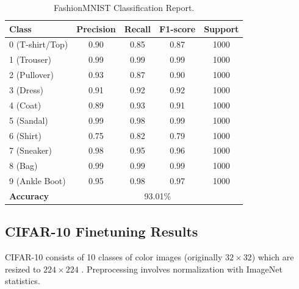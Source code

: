 \documentclass[conference]{IEEEtran}
\begin{document}
\begin{table}[H]
    \centering
    \scriptsize
    \begin{tabular}{lcccc}
        \toprule
        \textbf{Class}    & \textbf{Precision}          & \textbf{Recall} & \textbf{F1-score} & \textbf{Support} \\
        \midrule
        0 (T-shirt/Top)   & 0.90                        & 0.85            & 0.87              & 1000             \\
        1 (Trouser)       & 0.99                        & 0.99            & 0.99              & 1000             \\
        2 (Pullover)      & 0.93                        & 0.87            & 0.90              & 1000             \\
        3 (Dress)         & 0.91                        & 0.92            & 0.92              & 1000             \\
        4 (Coat)          & 0.89                        & 0.93            & 0.91              & 1000             \\
        5 (Sandal)        & 0.99                        & 0.98            & 0.99              & 1000             \\
        6 (Shirt)         & 0.75                        & 0.82            & 0.79              & 1000             \\
        7 (Sneaker)       & 0.98                        & 0.95            & 0.96              & 1000             \\
        8 (Bag)           & 0.99                        & 0.99            & 0.99              & 1000             \\
        9 (Ankle Boot)    & 0.95                        & 0.98            & 0.97              & 1000             \\
        \midrule
        \textbf{Accuracy} & \multicolumn{4}{c}{93.01\%}                                                          \\
        \bottomrule
    \end{tabular}
    \caption{FashionMNIST Classification Report.}
    \label{tab:fashionmnist_report}
\end{table}

\subsection{CIFAR-10 Finetuning Results}
CIFAR-10 consists of 10 classes of color images (originally $32\times32$) which
are resized to $224\times224$ \cite{cifar}. Preprocessing involves
normalization with ImageNet statistics.
\end{document}
